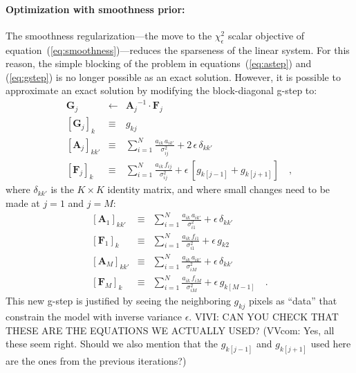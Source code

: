 \documentclass[12pt,preprint]{aastex}
\newcommand{\equationname}{equation}
\newcommand{\tv}[1]{\boldsymbol{#1}}
\newcommand{\inverse}[1]{{#1}^{-1}}
\begin{document}
\paragraph{Optimization with smoothness prior:}

The smoothness regularization---the move to the $\chi^2_{\epsilon}$
scalar objective of \equationname~(\ref{eq:smoothness})---reduces the
sparseness of the linear system.  For this reason, the simple blocking
of the problem in {\equationname}s~(\ref{eq:astep}) and
(\ref{eq:gstep}) is no longer possible as an exact solution.  However,
it is possible to approximate an exact solution by modifying the
block-diagonal g-step to:
\begin{eqnarray}\label{eq:gstep_smooth}\displaystyle
\tv{G}_j & \gets & \inverse{\tv{A}_j}\cdot\tv{F}_j \nonumber\\
\left[\tv{G}_j\right]_k & \equiv & g_{kj} \nonumber\\
\left[\tv{A}_j\right]_{kk'} & \equiv & \sum_{i=1}^{N} \frac{a_{ik}\,a_{ik'}}{\sigma_{ij}^2} + 2\,\epsilon\,\delta_{kk'} \nonumber\\
\left[\tv{F}_j\right]_k     & \equiv & \sum_{i=1}^{N} \frac{a_{ik}\,f_{i j}}{\sigma_{ij}^2} + \epsilon\,[g_{k[j-1]} + g_{k[j+1]}]
\quad ,
\end{eqnarray}
where $\delta_{kk'}$ is the $K\times K$ identity matrix, and where
small changes need to be made at $j=1$ and $j=M$:
\begin{eqnarray}\label{eq:gstep_tweaks}\displaystyle
\left[\tv{A}_1\right]_{kk'} & \equiv & \sum_{i=1}^{N} \frac{a_{ik}\,a_{ik'}}{\sigma_{i1}^2} + \epsilon\,\delta_{kk'} \nonumber\\
\left[\tv{F}_1\right]_k     & \equiv & \sum_{i=1}^{N} \frac{a_{ik}\,f_{i 1}}{\sigma_{i1}^2} + \epsilon\,g_{k2} \nonumber\\
\left[\tv{A}_M\right]_{kk'} & \equiv & \sum_{i=1}^{N} \frac{a_{ik}\,a_{ik'}}{\sigma_{iM}^2} + \epsilon\,\delta_{kk'} \nonumber\\
\left[\tv{F}_M\right]_k     & \equiv & \sum_{i=1}^{N} \frac{a_{ik}\,f_{i M}}{\sigma_{iM}^2} + \epsilon\,g_{k[M-1]}
\quad .
\end{eqnarray}
This new g-step is justified by seeing the neighboring $g_{kj}$ pixels
as ``data'' that constrain the model with inverse variance $\epsilon$.
VIVI: CAN YOU CHECK THAT THESE ARE THE EQUATIONS WE ACTUALLY USED? 
(VVcom: Yes, all these seem right. Should we also mention that the $g_{k[j-1]}$ 
and $g_{k[j+1]}$ used here are the ones from the previous iterations?)
\end{document}
